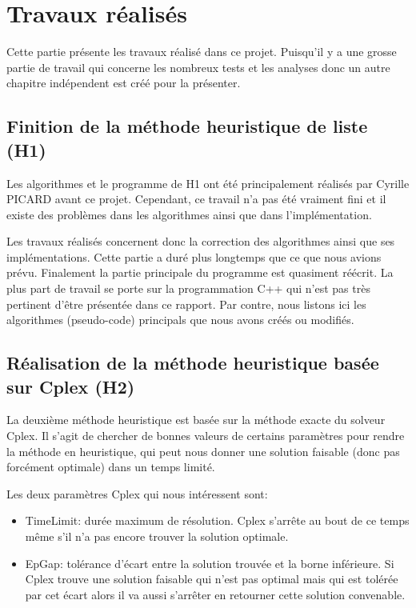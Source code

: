 \chapter{Travaux réalisés}
Cette partie présente les travaux réalisé dans ce projet.  Puisqu'il y a une grosse partie de travail qui concerne les nombreux tests et les analyses donc un autre chapitre indépendent est créé pour la présenter.

\section{Finition de la méthode heuristique de liste (H1)}%
Les algorithmes et le programme de H1 ont été principalement réalisés par Cyrille PICARD avant ce projet. Cependant, ce travail n'a pas été vraiment fini et il existe des problèmes dans les algorithmes ainsi que dans l'implémentation.

Les travaux réalisés concernent donc la correction des algorithmes ainsi que ses implémentations. Cette partie a duré plus longtemps que ce que nous avions prévu. Finalement la partie principale du programme est quasiment réécrit. La plus part de travail se porte sur la programmation C++ qui n'est pas très pertinent d'être présentée dans ce rapport. Par contre, nous listons ici les algorithmes (pseudo-code) principals que nous avons créés ou modifiés.




\section{Réalisation de la méthode heuristique basée sur Cplex (H2)}%
La deuxième méthode heuristique est basée sur la méthode exacte du solveur Cplex. Il s'agit de chercher de bonnes valeurs de certains paramètres pour rendre la méthode en heuristique, qui peut nous donner une solution faisable (donc pas forcément optimale) dans un temps limité.

Les deux paramètres Cplex qui nous intéressent sont:
\begin{itemize}
	\item TimeLimit: durée maximum de résolution. Cplex s'arrête au bout de ce temps même s'il n'a pas encore trouver la solution optimale.
	\item EpGap: tolérance d’écart entre la solution trouvée et la borne inférieure. Si Cplex trouve une solution faisable qui n'est pas optimal mais qui est tolérée par cet écart alors il va aussi s'arrêter en retourner cette solution convenable.
\end{itemize}


